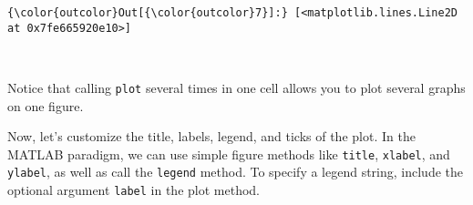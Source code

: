 \documentclass{article}
\begin{document}
            \begin{Verbatim}[commandchars=\\\{\}]
{\color{outcolor}Out[{\color{outcolor}7}]:} [<matplotlib.lines.Line2D at 0x7fe665920e10>]
\end{Verbatim}
        
    \begin{center}
    \end{center}
    { \hspace*{\fill} \\}
    
    Notice that calling \texttt{plot} several times in one cell allows you
to plot several graphs on one figure.

Now, let's customize the title, labels, legend, and ticks of the plot.
In the MATLAB paradigm, we can use simple figure methods like
\texttt{title}, \texttt{xlabel}, and \texttt{ylabel}, as well as call
the \texttt{legend} method. To specify a legend string, include the
optional argument \texttt{label} in the plot method.
\end{document}

